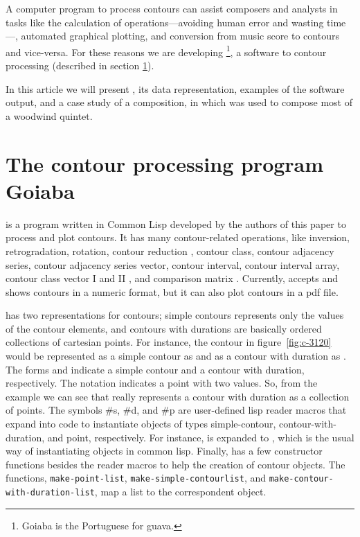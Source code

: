 A computer program to process contours can assist composers and
analysts in tasks like the calculation of operations---avoiding human
error and wasting time---, automated graphical plotting, and
conversion from music score to contours and vice-versa. For these
reasons we are developing \goiaba{}\footnote{Goiaba is the Portuguese
  for guava.}, a software to contour processing (described in section
\ref{sec:goiaba}).

In this article we will present \goiaba{}, its data representation,
examples of the software output, and a case study of a composition, in
which \goiaba{} was used to compose most of a woodwind quintet.

\section{The contour processing program Goiaba}
\label{sec:goiaba}

\goiaba{} is a program written in Common Lisp
\cite{graham94:lisp,team07:sbcl} developed by the authors of this
paper to process and plot contours. It has many contour-related
operations, like inversion, retrogradation, rotation, contour
reduction \cite{adams76:melodic}, contour class, contour adjacency
series, contour adjacency series vector, contour interval, contour
interval array, contour class vector I and II
\cite{friedmann85:methodology}, and comparison matrix
\cite{morris93:directions}. Currently, \goiaba{} accepts and shows
contours in a numeric format, but it can also plot contours in a pdf
file.

\goiaba{} has two representations for contours; simple contours
represents only the values of the contour elements, and contours with
durations are basically ordered collections of cartesian points. For
instance, the contour in figure~\ref{fig:c-3120} would be represented
as a simple contour as  and as a contour with
duration as . The forms
 and  indicate a simple contour
and a contour with duration, respectively. The notation  indicates a point with two values. So, from the example we can
see that \goiaba{} really represents a contour with duration as a
collection of points. The symbols \#s, \#d, and \#p are user-defined
lisp reader macros that expand into code to instantiate objects of
types simple-contour, contour-with-duration, and point, respectively.
For instance,  is expanded to , which is the usual way of instantiating objects
in common lisp. Finally, \goiaba{} has a few constructor functions
besides the reader macros to help the creation of contour objects. The
functions, \texttt{make-point-list},
\texttt{make-sim\-ple-contour\-list}, and
\texttt{make-contour-with-du\-ra\-tion-list}, map a list to the
correspondent object.

